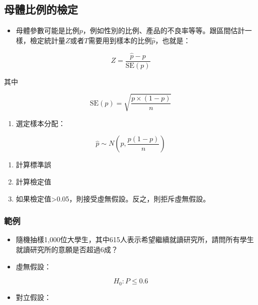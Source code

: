 \documentclass[hyperref,]{ctexart}
\providecommand{\tightlist}{%
  \setlength{\itemsep}{0pt}\setlength{\parskip}{0pt}}
\begin{document}
\hypertarget{ux6bcdux9ad4ux6bd4ux4f8bux7684ux6aa2ux5b9a}{%
\subsection{母體比例的檢定}\label{ux6bcdux9ad4ux6bd4ux4f8bux7684ux6aa2ux5b9a}}

\begin{itemize}
\tightlist
\item
  母體參數可能是比例\(p\)，例如性別的比例、產品的不良率等等。跟區間估計一樣，檢定統計量\(Z\)或者\(T\)需要用到樣本的比例\(\hat{p}\)，也就是：
\end{itemize}

\[Z=\frac{\hat{p}-p}{\text{SE}(p)}\]

其中

\[\text{SE}(p)=\sqrt{\frac{p\times(1-p)}{n}}\]

\begin{enumerate}
\def\labelenumi{\arabic{enumi}.}
\tightlist
\item
  選定樣本分配：
\end{enumerate}

\[\hat{p}\sim N(p,\frac{p(1-p)}{n})\]

\begin{enumerate}
\def\labelenumi{\arabic{enumi}.}
\setcounter{enumi}{1}
\tightlist
\item
  計算標準誤
\item
  計算檢定值
\item
  如果檢定值\textgreater0.05，則接受虛無假設。反之，則拒斥虛無假設。
\end{enumerate}

\hypertarget{ux7bc4ux4f8b-1}{%
\subsubsection{範例}\label{ux7bc4ux4f8b-1}}

\begin{itemize}
\item
  隨機抽樣1,000位大學生，其中615人表示希望繼續就讀研究所，請問所有學生就讀研究所的意願是否超過6成？
\item
  虛無假設：
\end{itemize}

\[H_{0}: P\leq 0.6\]

\begin{itemize}
\tightlist
\item
  對立假設：
\end{itemize}
\end{document}
